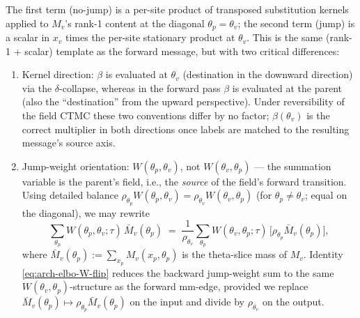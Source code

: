 The first term (no-jump) is a per-site product of transposed
substitution kernels applied to $M_v$'s rank-1 content at the diagonal
$\theta_p = \theta_v$; the second term (jump) is a scalar in $x_v$
times the per-site stationary product at $\theta_v$. This is the same
(rank-1 + scalar) template as the forward message, but with two
critical differences:
\begin{enumerate}[label=(\alph*),leftmargin=1.6em]
\item Kernel direction: $\beta$ is evaluated at $\theta_v$ (destination
    in the downward direction) via the $\delta$-collapse, whereas in
    the forward pass $\beta$ is evaluated at the parent (also the
    ``destination'' from the upward perspective). Under reversibility
    of the field CTMC these two conventions differ by no factor;
    $\beta(\theta_v)$ is the correct multiplier in both directions
    once labels are matched to the resulting message's source axis.
\item Jump-weight orientation: $W(\theta_p, \theta_v)$, not
    $W(\theta_v, \theta_p)$ --- the summation variable is the parent's
    field, i.e., the \emph{source} of the field's forward transition.
    Using detailed balance $\rho_{\theta_p} W(\theta_p, \theta_v) =
    \rho_{\theta_v} W(\theta_v, \theta_p)$ (for $\theta_p \neq
    \theta_v$; equal on the diagonal), we may rewrite
    \begin{equation}
      \sum_{\theta_p} W(\theta_p, \theta_v; \tau)\, \bar M_v(\theta_p)
      \;=\;
      \frac{1}{\rho_{\theta_v}}
      \sum_{\theta_p} W(\theta_v, \theta_p; \tau)\,
      \bigl[\rho_{\theta_p} \bar M_v(\theta_p)\bigr],
      \label{eq:arch-elbo-W-flip}
    \end{equation}
    where $\bar M_v(\theta_p) := \sum_{x_p} M_v(x_p, \theta_p)$ is the
    theta-slice mass of $M_v$. Identity \eqref{eq:arch-elbo-W-flip}
    reduces the backward jump-weight sum to the same $W(\theta_v,
    \theta_p)$-structure as the forward mm-edge, provided we replace
    $\bar M_v(\theta_p) \mapsto \rho_{\theta_p} \bar M_v(\theta_p)$ on
    the input and divide by $\rho_{\theta_v}$ on the output.
\end{enumerate}


